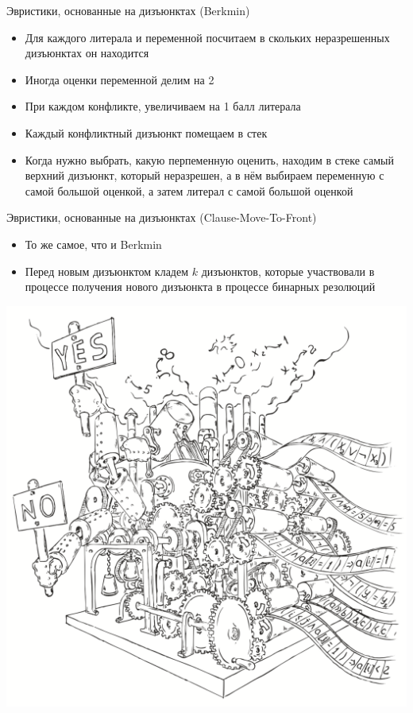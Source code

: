 \documentclass{beamer}
\begin{document}
\begin{frame}{Эвристики, основанные на дизъюнктах (Berkmin)}
\begin{itemize}
\item Для каждого литерала и переменной посчитаем в скольких неразрешенных дизъюнктах он находится
\item Иногда оценки переменной делим на 2
\item При каждом конфликте, увеличиваем на 1 балл литерала
\item Каждый конфликтный дизъюнкт помещаем в стек
\item Когда нужно выбрать, какую перпеменную оценить, находим в стеке самый верхний дизъюнкт, который неразрешен, а в нём
выбираем переменную с самой большой оценкой, а затем литерал с самой большой оценкой
\end{itemize}
\end{frame}

\begin{frame}{Эвристики, основанные на дизъюнктах (Clause-Move-To-Front)}
\begin{itemize}
\item То же самое, что и Berkmin
\item Перед новым дизъюнктом кладем $k$ дизъюнктов, которые участвовали в процессе получения нового дизъюнкта в процессе
бинарных резолюций
\end{itemize}
\end{frame}

\begin{frame}
\includegraphics[scale=0.5]{../decision-procedure.png}
\end{frame}
\end{document}
